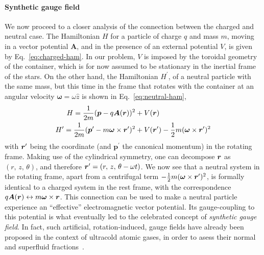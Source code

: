 \paragraph{Synthetic gauge field}
We now proceed to a closer analysis of the connection between the
charged and neutral case. The Hamiltonian $H$ for a particle of charge
$q$ and mass $m$, moving in a vector potential $\bm{A}$, and in the
presence of an external potential $V$, is given by
Eq.~\eqref{eq:charged-ham}. In our problem, $V$ is imposed by the
toroidal geometry of the container, which is for now assumed to be
stationary in the inertial frame of the stars. On the other hand, the
Hamiltonian $H^{\prime}$, of a neutral particle with the same mass,
but this time in the frame that rotates with the container at an
angular velocity $\bm{\omega} = \omega\hat{z}$ is shown in
Eq.~\eqref{eq:neutral-ham},
%
\begin{align}
    H  = \frac{1}{2m}(\bm{p} - q\bm{A}(\bm{r}))^2 & + V(\bm{r})\label{eq:charged-ham}\\
    H^{\prime}  = \frac{1}{2m}(\bm{p}^{\prime}-m\bm{\omega}\times
    \bm{r}^{\prime})^2 & + V(\bm{r}^{\prime}) - \frac{1}{2}m(\bm{\omega}\times
    \bm{r}^{\prime})^2\label{eq:neutral-ham}
\end{align}
%
with $\bm{r}^{\prime}$ being the coordinate (and $\bm{p}^{\prime}$ the
canonical momentum) in the rotating frame. Making use of the
cylindrical symmetry, one can decompose $\bm{r}$ as $(r,\,z,\,\theta)$,
and therefore $\bm{r}^{\prime} = (r,\,z,\,\theta-\omega t)$.
%
We now see that a neutral system in the rotating frame, apart from a
centrifugal term $- \frac{1}{2}m(\bm{\omega}\times \bm{r}^{\prime})^2$,
is formally identical to a charged system in the rest frame, with the
correspondence $q\bm{A}(\bm{r}) \leftrightarrow m\bm{\omega}\times
\bm{r}$. This connection can be used to make a neutral particle
experience an ``effective'' electromagnetic vector potential. Its
gauge-coupling to this potential is what eventually led to the
celebrated concept of \textit{synthetic gauge field}.
%
In fact, such artificial, rotation-induced, gauge fields have already
been proposed in the context of ultracold atomic gases, in order to
asess their normal and superfluid
fractions~\cite{Cooper2010,Carusotto2011,John2011}.


